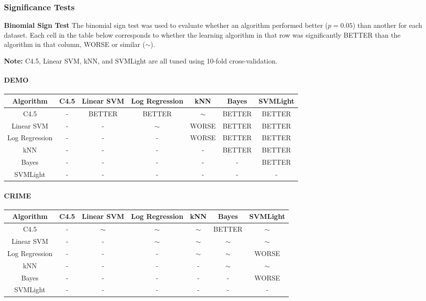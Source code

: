 \documentclass[11pt,letter]{article}
\begin{document}
\subsubsection{Significance Tests}

\textbf{Binomial Sign Test}
The binomial sign test was used to evaluate whether an algorithm performed better ($p=0.05$) than another for each dataset. Each cell in the table below corresponds to whether the learning algorithm in that row was significantly BETTER than the algorithm in that column, WORSE or similar ($\sim$).

\textbf{Note:} C4.5, Linear SVM, kNN, and SVMLight are all tuned using 10-fold cross-validation.

\paragraph{DEMO} \quad

\begin{tabular}{|c|c|c|c|c|c|c|}
\hline
Algorithm & C4.5  & Linear SVM & Log Regression & kNN  & Bayes & SVMLight \\
\hline
C4.5 	& -		& BETTER	& BETTER	& $\sim$	& BETTER	& BETTER	\\
Linear SVM		& -		& -			& $\sim$	& WORSE		& BETTER	& BETTER	\\
Log Regression	& -		& -			& -			& WORSE		& BETTER	& BETTER	\\
kNN 		& -		& -			& -			& -			& BETTER	& BETTER	\\
Bayes			& -		& -			& -			& -			& -			& BETTER	\\
SVMLight & - & - & - & - & - & - \\
\hline
\end{tabular}

\paragraph{CRIME} \quad

\begin{tabular}{|c|c|c|c|c|c|c|}
\hline
Algorithm & C4.5  & Linear SVM & Log Regression & kNN  & Bayes & SVMLight \\
\hline
C4.5 	& -		& $\sim$	& $\sim$	& $\sim$	& BETTER	& $\sim$	\\
Linear SVM		& -		& -			& $\sim$	& $\sim$	& $\sim$	& $\sim$	\\
Log Regression	& -		& -			& -			& $\sim$	& $\sim$	& WORSE 	\\
kNN 		& -		& -			& -			& -			& $\sim$	& $\sim$	\\
Bayes			& -		& -			& -			& -			& -			& WORSE		\\
SVMLight & - & - & - & - & - & - \\
\hline
\end{tabular}
\end{document}
